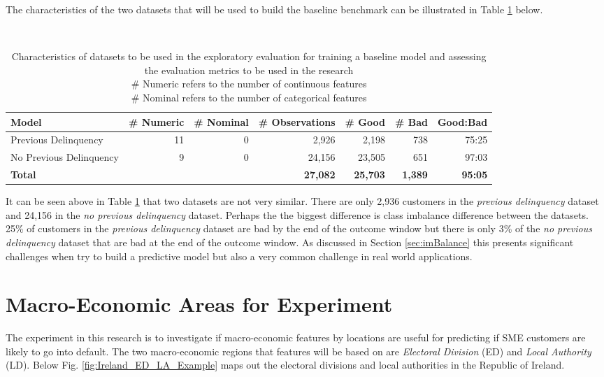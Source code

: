 The characteristics of the two datasets that will be used to build the baseline benchmark can be illustrated in Table \ref{characteristicsDatasets} below.

\begin{table}[H]
	\centering\
	\resizebox{\textwidth}{!}
	{
		\begin{tabular}{l r r r r r r}
			\hline
			\textbf{Model} &  \textbf{\# Numeric} & \textbf{\# Nominal} & \textbf{\# Observations} & \textbf{\# Good} & \textbf{\# Bad} & \textbf{Good:Bad}\\
			\hline
			Previous Delinquency & 11 & 0 & 2,926 & 2,198  & 738 & 75:25 \\ 
			No Previous Delinquency & 9 & 0 & 24,156 & 23,505 & 651  & 97:03 \\ \hline
			\textbf{Total} &  &  & \textbf{27,082} & \textbf{25,703} & \textbf{1,389} & \textbf{95:05} \\ \hline
		\end{tabular}
	}
	\caption{Characteristics of datasets to be used in the exploratory evaluation for training a baseline model and assessing the evaluation metrics to be used in the research \\
		 \# Numeric refers to the number of continuous features \\
		 \# Nominal refers to the number of categorical features
		}
	\label{characteristicsDatasets}
\end{table}

It can be seen above in Table \ref{characteristicsDatasets} that two datasets are not very similar. There are only 2,936 customers in the \textit{previous delinquency} dataset and 24,156 in the \textit{no previous delinquency} dataset. Perhaps the the biggest difference is class imbalance difference between the datasets. 25\% of customers in the \textit{previous delinquency} dataset are bad by the end of the outcome window but there is only 3\% of the \textit{no previous delinquency} dataset that are bad at the end of the outcome window. As discussed in Section \ref{sec:imBalance} this presents significant challenges when try to build a predictive model but also a very common challenge in real world applications. 



\section{Macro-Economic Areas for Experiment}
The experiment in this research is to investigate if macro-economic features by locations are useful for predicting if SME customers are likely to go into default. The two macro-economic regions that features will be based on are \textit{Electoral Division} (ED) and \textit{Local Authority} (LD). Below Fig. \ref{fig:Ireland_ED_LA_Example} maps out the electoral divisions and local authorities in the Republic of Ireland.

